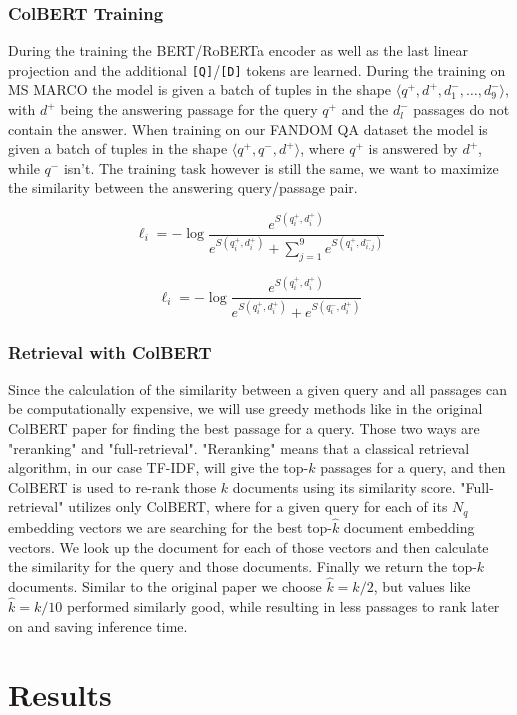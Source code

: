 \documentclass{article}
\begin{document}
\subsubsection{ColBERT Training}

During the training the BERT/RoBERTa encoder as well as the last linear projection and the additional \texttt{[Q]}/\texttt{[D]} tokens are learned. During the training on MS MARCO the model is given a batch of tuples in the shape $\langle q^+, d^+, d_1^-, \dots, d_{9}^-\rangle$, with $d^+$ being the answering passage for the query $q^+$ and the $d_l^-$ passages do not contain the answer. When training on our FANDOM QA dataset the model is given a batch of tuples in the shape $\langle q^+, q^-, d^+\rangle$, where $q^+$ is answered by $d^+$, while $q^-$ isn't. The training task however is still the same, we want to maximize the similarity between the answering query/passage pair. 

$$
\ell_i = -\log \frac{e^{S(q_i^+, d_i^+)}}{e^{S(q_i^+, d_i^+)} + \sum_{j=1}^{9}{e^{S(q_i^+, d_{i, j}^-)}}}
$$

$$
\ell_i = -\log \frac{e^{S(q_i^+, d_i^+)}}{e^{S(q_i^+, d_i^+)} + e^{S(q_i^-, d_i^+)}}
$$

\subsubsection{Retrieval with ColBERT}
Since the calculation of the similarity between a given query and all passages can be computationally expensive, we will use greedy methods like in the original ColBERT paper for finding the best passage for a query. Those two ways are "reranking" and "full-retrieval". "Reranking" means that a classical retrieval algorithm, in our case TF-IDF, will give the top-$k$ passages for a query, and then ColBERT is used to re-rank those $k$ documents using its similarity score. "Full-retrieval" utilizes only ColBERT, where for a given query for each of its $N_q$ embedding vectors we are searching for the best top-$\hat{k}$ document embedding vectors. We look up the document for each of those vectors and then calculate the similarity for the query and those documents. Finally we return the top-$k$ documents. Similar to the original paper we choose $\hat{k} = k / 2$, but values like $\hat{k} = k / 10$ performed similarly good, while resulting in less passages to rank later on and saving inference time.


\section{Results}
\end{document}
